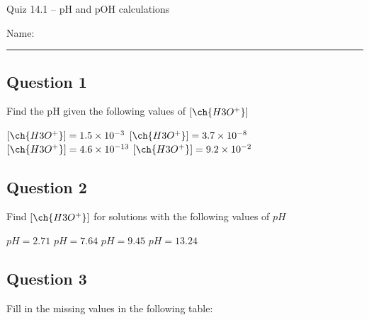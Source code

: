 \documentclass[11pt, letterpaper]{memoir}
\begin{document}
	\begin{center}
		{\large	Quiz 14.1 -- pH and pOH calculations}
	\end{center}
	{\large Name: \rule[-1mm]{4in}{.1pt} 
	
	
	\subsection*{Question 1}
	Find the pH given the following values of $\left[\ch{H3O^+}\right]$
	
	\noindent
	{\large $\left[\ch{H3O^+}\right] = 1.5\times10^{-3}$ \hspace{2em}  $\left[\ch{H3O^+}\right] = 3.7\times10^{-8}$ \hspace{2em}  $\left[\ch{H3O^+}\right] = 4.6\times10^{-13}$  \hspace{2em} $\left[\ch{H3O^+}\right] = 9.2\times10^{-2}$}
	
	\vspace{4em}
	\subsection*{Question 2}
	Find $\left[\ch{H3O^+}\right]$ for solutions with the following values of $pH$
	
	\noindent
	{\large $pH = 2.71$ \hspace{6em}  $pH = 7.64$ \hspace{6em}  $pH=9.45$  \hspace{6em} $pH = 13.24$}
	
	\vspace{4em}
	\subsection*{Question 3}
	Fill in the missing values in the following table:
	
}
\end{document}

